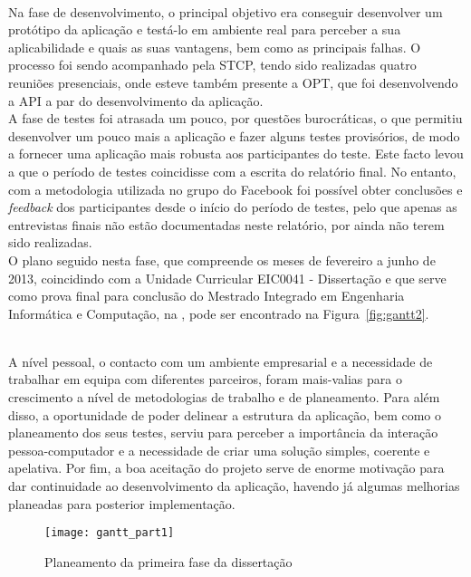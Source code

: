 ~\\Na fase de desenvolvimento, o principal objetivo era conseguir desenvolver um protótipo da aplicação e testá-lo em ambiente real para perceber a sua aplicabilidade e quais as suas vantagens, bem como as principais falhas. O processo foi sendo acompanhado pela STCP, tendo sido realizadas quatro reuniões presenciais, onde esteve também presente a OPT, que foi desenvolvendo a API a par do desenvolvimento da aplicação.
\\A fase de testes foi atrasada um pouco, por questões burocráticas, o que permitiu desenvolver um pouco mais a aplicação e fazer alguns testes provisórios, de modo a fornecer uma aplicação mais robusta aos participantes do teste. Este facto levou a que o período de testes coincidisse com a escrita do relatório final. No entanto, com a metodologia utilizada no grupo do Facebook foi possível obter conclusões e \emph{feedback} dos participantes desde o início do período de testes, pelo que apenas as entrevistas finais não estão documentadas neste relatório, por ainda não terem sido realizadas.
\\O plano seguido nesta fase, que compreende os meses de fevereiro a junho de 2013, coincidindo com a Unidade Curricular EIC0041 - Dissertação e que serve como prova final para conclusão do Mestrado Integrado em Engenharia Informática e Computação, na \Feup, pode ser encontrado na Figura~\ref{fig:gantt2}.

~\\A nível pessoal, o contacto com um ambiente empresarial e a necessidade de trabalhar em equipa com diferentes parceiros, foram mais-valias para o crescimento a nível de metodologias de trabalho e de planeamento. Para além disso, a oportunidade de poder delinear a estrutura da aplicação, bem como o planeamento dos seus testes, serviu para perceber a importância da interação pessoa-computador e a necessidade de criar uma solução simples, coerente e apelativa. Por fim, a boa aceitação do projeto serve de enorme motivação para dar continuidade ao desenvolvimento da aplicação, havendo já algumas melhorias planeadas para posterior implementação.

\begin{figure}[t]
  \begin{center}
    \leavevmode
    \texttt{[image: gantt\_part1]}
    \caption{Planeamento da primeira fase da dissertação}
    \label{fig:gantt1}
  \end{center}
\end{figure}

